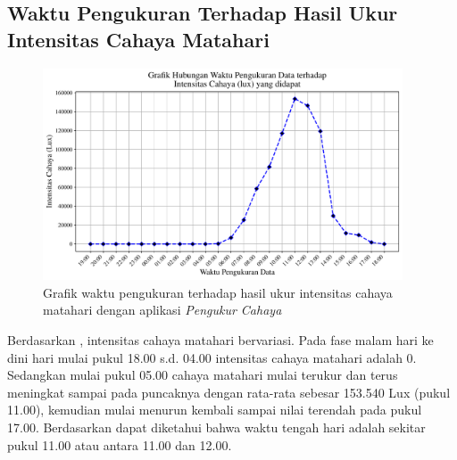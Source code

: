 \subsection{Waktu Pengukuran Terhadap Hasil Ukur Intensitas Cahaya Matahari}
\vspace{-0.5em}
\begin{figure}[H]
    \includegraphics[width=0.95\textwidth]{dataset/grafik waktu vs intensitas.pdf}
    \caption{Grafik waktu pengukuran terhadap hasil ukur intensitas cahaya matahari dengan aplikasi \textit{Pengukur Cahaya}}
\end{figure}
Berdasarkan , intensitas cahaya matahari bervariasi. Pada fase malam hari ke dini hari mulai pukul 18.00 s.d. 04.00 intensitas cahaya matahari adalah 0. Sedangkan mulai pukul 05.00 cahaya matahari mulai terukur dan terus meningkat sampai pada puncaknya dengan rata-rata sebesar 153.540 Lux (pukul 11.00), kemudian mulai menurun kembali sampai nilai terendah pada pukul 17.00. Berdasarkan  dapat diketahui bahwa waktu tengah hari adalah sekitar pukul 11.00 atau antara 11.00 dan 12.00.

